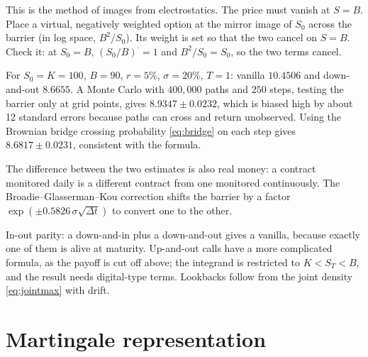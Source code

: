 \begin{intuition}
This is the method of images from electrostatics. The price must vanish at $S=B$. Place a virtual, negatively weighted option at the mirror image of $S_0$ across the barrier (in log space, $B^2/S_0$). Its weight is set so that the two cancel on $S=B$. Check it: at $S_0=B$, $(S_0/B)^{\cdot}=1$ and $B^2/S_0=S_0$, so the two terms cancel.
\end{intuition}

\begin{numcheck}
For $S_0=K=100$, $B=90$, $r=5\%$, $\sigma=20\%$, $T=1$: vanilla $10.4506$ and down-and-out $8.6655$. A Monte Carlo with $400{,}000$ paths and $250$ steps, testing the barrier only at grid points, gives $8.9347\pm0.0232$, which is biased high by about 12 standard errors because paths can cross and return unobserved. Using the Brownian bridge crossing probability \eqref{eq:bridge} on each step gives $8.6817\pm0.0231$, consistent with the formula.
\end{numcheck}

The difference between the two estimates is also real money: a contract monitored daily is a different contract from one monitored continuously. The Broadie--Glasserman--Kou correction shifts the barrier by a factor $\exp(\pm0.5826\,\sigma\sqrt{\Delta t})$ to convert one to the other.

\begin{remark}
In-out parity: a down-and-in plus a down-and-out gives a vanilla, because exactly one of them is alive at maturity. Up-and-out calls have a more complicated formula, as the payoff is cut off above; the integrand is restricted to $K<S_T<B$, and the result needs digital-type terms. Lookbacks follow from the joint density \eqref{eq:jointmax} with drift.
\end{remark}

\section{Martingale representation}

